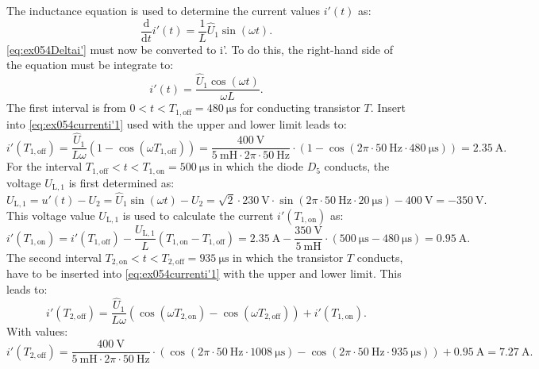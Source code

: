 
\begin{solutionblock}
    The inductance equation is used to determine the current values $i'(t)$ as:
    \begin{equation}
        \frac{\mathrm{d}}{\mathrm{d}t}i'(t) = \frac{1}{L}\hat U_\mathrm{1} \sin(\omega t).\label{eq:ex054Deltai'}
    \end{equation}
    \eqref{eq:ex054Deltai'} must now be converted to i'. To do this, the right-hand side of the equation must be integrate to:
    \begin{equation}
        i'(t)=\frac{\hat U_\mathrm{1} \cos(\omega t)}{\omega L}.\label{eq:ex054currenti'1}
    \end{equation}
    The first interval is from $0 < t < T_\mathrm{1,off} = \SI{480}{\micro\s}$ for conducting transistor $T$. Insert into \eqref{eq:ex054currenti'1} used with the upper and lower limit leads to:
    \begin{equation}
        i'(T_\mathrm{1,off}) = \frac{\hat U_\mathrm{1}}{L \omega}(1- \cos(\omega T_\mathrm{1,off})) = \frac{\SI{400}{\volt}}{\SI{5}{\milli\henry}\cdot 2\pi \cdot \SI{50}{\hertz}}\cdot (1-\cos(2\pi \cdot \SI{50}{\hertz} \cdot \SI{480}{\micro\s})) = \SI{2.35}{\ampere}.
    \end{equation}
    For the interval $T_\mathrm{1,off} < t < T_\mathrm{1,on} = \SI{500}{\micro\s}$ in which the diode $D_\mathrm{5}$ conducts, the voltage $U_\mathrm{L,1}$ is first determined as:
    \begin{equation}
        U_\mathrm{L,1} = u'(t) - U_\mathrm{2}= \hat U_\mathrm{1} \sin(\omega t) - U_\mathrm{2} = \sqrt{2} \cdot \SI{230}{\volt} \cdot \sin(2\pi \cdot \SI{50}{\hertz}\cdot \SI{20}{\micro\s}) - \SI{400}{\volt} = -\SI{350}{\volt}.
    \end{equation}
    This voltage value  $U_\mathrm{L,1}$ is used to calculate the current  $i'(T_\mathrm{1,on})$ as:
    \begin{equation}
        i'(T_\mathrm{1,on}) = i'(T_\mathrm{1,off}) -\frac{ U_\mathrm{L,1}}{L}(T_\mathrm{1,on}-T_\mathrm{1,off}) = \SI{2.35}{\ampere} -\frac{\SI{350}{\volt}}{\SI{5}{\milli\henry}}\cdot (\SI{500}{\micro\s}-\SI{480}{\micro\s}) = \SI{0.95}{\ampere}.
    \end{equation}
     The second interval  $T_\mathrm{2,on} < t < T_\mathrm{2,off}  = \SI{935}{\micro\s}$ in which the transistor $T$ conducts, have to be inserted  into \eqref{eq:ex054currenti'1} with the upper and lower limit. This leads to:
     \begin{equation}
        i'(T_\mathrm{2,off}) = \frac{\hat U_\mathrm{1}}{L \omega}(\cos (\omega T_\mathrm{2,on})- \cos(\omega T_\mathrm{2,off}))+ i'(T_\mathrm{1,on}).
    \end{equation}
    With values:
    \begin{equation}
        i'(T_\mathrm{2,off}) = \frac{\SI{400}{\volt}}{\SI{5}{\milli\henry}\cdot 2\pi \cdot \SI{50}{\hertz}}\cdot (\cos(2\pi \cdot \SI{50}{\hertz}\cdot \SI{1008}{\micro\s})-\cos(2\pi \cdot \SI{50}{\hertz} \cdot \SI{935}{\micro\s})) + \SI{0.95}{\ampere}= \SI{7.27}{\ampere}.
     \end{equation}


\end{solutionblock}
